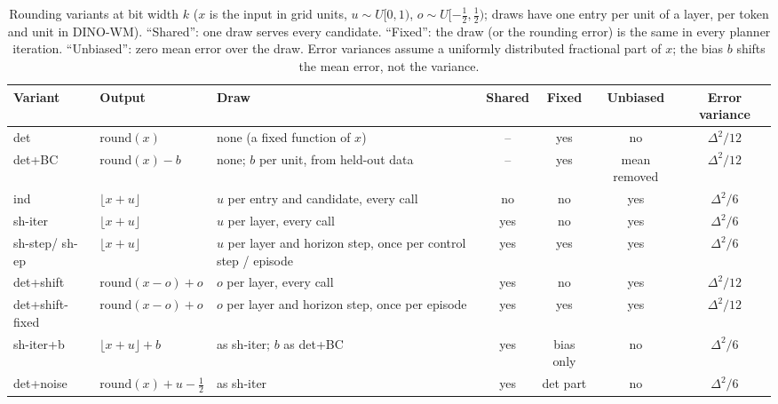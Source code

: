 \documentclass[10pt]{article}
\newcommand{\dtm}{\textsf{det}\xspace}
\newcommand{\detbc}{\textsf{det+BC}\xspace}
\newcommand{\shiter}{\textsf{sh-iter}\xspace}
\newcommand{\shiterb}{\textsf{sh-iter+b}\xspace}
\newcommand{\shstep}{\textsf{sh-step}\xspace}
\newcommand{\shep}{\textsf{sh-ep}\xspace}
\newcommand{\detshift}{\textsf{det+shift}\xspace}
\newcommand{\detshiftfix}{\textsf{det+shift-fixed}\xspace}
\newcommand{\detnoise}{\textsf{det+noise}\xspace}
\newcommand{\ind}{\textsf{ind}\xspace}
\begin{document}
\begin{table}[t]
\caption{Rounding variants at bit width $k$ ($x$ is the input in grid units, $u\sim U[0,1)$, $o\sim U[-\tfrac12,\tfrac12)$; draws have one entry per unit of a layer, per token and unit in DINO-WM). ``Shared'': one draw serves every candidate. ``Fixed'': the draw (or the rounding error) is the same in every planner iteration. ``Unbiased'': zero mean error over the draw. Error variances assume a uniformly distributed fractional part of $x$; the bias $b$ shifts the mean error, not the variance.}
\label{tab:variants}
\centering\footnotesize
\setlength{\tabcolsep}{3.5pt}
\begin{tabular}{@{}ll>{\raggedright}p{5.0cm}cccc@{}}
\toprule
Variant & Output & Draw & Shared & Fixed & Unbiased & Error variance \\
\midrule
\dtm & $\mathrm{round}(x)$ & none (a fixed function of $x$) & -- & yes & no & $\Delta^2/12$ \\
\detbc & $\mathrm{round}(x)-b$ & none; $b$ per unit, from held-out data & -- & yes & mean removed & $\Delta^2/12$ \\
\ind & $\lfloor x+u\rfloor$ & $u$ per entry and candidate, every call & no & no & yes & $\Delta^2/6$ \\
\shiter & $\lfloor x+u\rfloor$ & $u$ per layer, every call & yes & no & yes & $\Delta^2/6$ \\
\shstep / \shep & $\lfloor x+u\rfloor$ & $u$ per layer and horizon step, once per control step / episode & yes & yes & yes & $\Delta^2/6$ \\
\detshift & $\mathrm{round}(x-o)+o$ & $o$ per layer, every call & yes & no & yes & $\Delta^2/12$ \\
\detshiftfix & $\mathrm{round}(x-o)+o$ & $o$ per layer and horizon step, once per episode & yes & yes & yes & $\Delta^2/12$ \\
\shiterb & $\lfloor x+u\rfloor+b$ & as \shiter; $b$ as \detbc & yes & bias only & no & $\Delta^2/6$ \\
\detnoise & $\mathrm{round}(x)+u-\tfrac12$ & as \shiter & yes & \dtm part & no & $\Delta^2/6$ \\
\bottomrule
\end{tabular}
\end{table}
\end{document}
